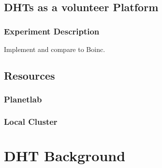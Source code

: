 \documentclass[10pt,letterpaper]{report}
\begin{document}
\section{DHTs as a volunteer Platform}
\subsection{Experiment Description}
Implement and compare to Boinc.



\section{Resources}
\subsection{Planetlab}
\subsection{Local Cluster}

\chapter{DHT Background}





\end{document}
